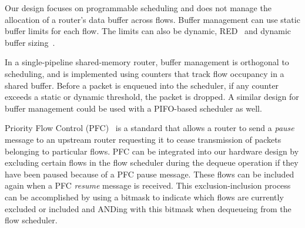 Our design focuses on programmable scheduling and does not manage the
allocation of a router's data buffer across flows.  Buffer management can use
static buffer limits for each flow. The limits can also be dynamic, \eg
RED~\cite{red} and dynamic buffer sizing~\cite{broadcom_dynamic}.

In a single-pipeline shared-memory router, buffer management is orthogonal to
scheduling, and is implemented using counters that track flow occupancy in a
shared buffer. Before a packet is enqueued into the scheduler, if any counter
exceeds a static or dynamic threshold, the packet is dropped. A similar design
for buffer management could be used with a PIFO-based scheduler as well.

Priority Flow Control (PFC)~\cite{pfc} is a standard that allows a router to
send a {\em pause} message to an upstream router requesting it to cease
transmission of packets belonging to particular flows. PFC can be integrated
into our hardware design by excluding certain flows in the flow scheduler
during the dequeue operation if they have been paused because of a PFC pause
message. These flows can be included again when a PFC {\em resume} message is
received.  This exclusion-inclusion process can be accomplished by using a
bitmask to indicate which flows are currently excluded or included and ANDing
with this bitmask when dequeueing from the flow scheduler.

